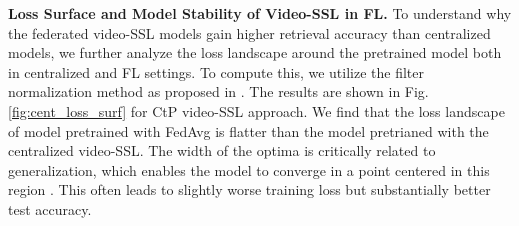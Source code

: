 \setlength{\tabcolsep}{1.7pt}
\begin{table}[t]
\begin{center}
    \caption{\small Video clip retrieval accuracies (\%) and fine-tuning accuracies (\%) on UCF and HMDB for CtP video-SSL approach using various aggregation strategies. The SSL pretraining is performed on K400 (Non-IID).
    Cent$^\dagger$ represents the centralized training for $27$ epochs which equals to $540$ rounds in our FL setting } 
    \label{Tab-action_finetune_adam}
\end{center}
\end{table}


\noindent \textbf{Loss Surface and Model Stability of Video-SSL in FL.}
To understand why the federated video-SSL models gain higher retrieval accuracy than centralized models, we further analyze the loss landscape around the pretrained model both in centralized and FL settings. To compute this, we utilize the filter normalization method as proposed in \cite{li2018visualizing}. The results are shown in Fig. \ref{fig:cent_loss_surf} for CtP video-SSL approach. We find that the loss landscape of model pretrained with FedAvg is flatter than the model pretrianed with the centralized video-SSL. 
The width of the optima is critically related to generalization, which enables the model to converge in a point centered in this region \cite{izmailov2018averaging,keskar2016large,hochreiter1997flat}. This often leads to slightly worse training loss but substantially better test accuracy.


